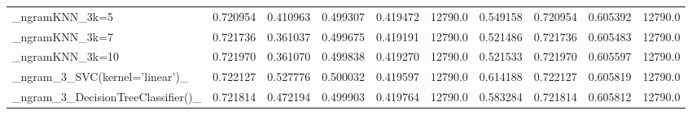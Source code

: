 \begin{tabular}{lrrrrrrrrr}
\_ngramKNN\_3k=5                                     &  0.720954 &         0.410963 &      0.499307 &        0.419472 &        12790.0 &            0.549158 &         0.720954 &           0.605392 &           12790.0 \\
\_ngramKNN\_3k=7                                     &  0.721736 &         0.361037 &      0.499675 &        0.419191 &        12790.0 &            0.521486 &         0.721736 &           0.605483 &           12790.0 \\
\_ngramKNN\_3k=10                                    &  0.721970 &         0.361070 &      0.499838 &        0.419270 &        12790.0 &            0.521533 &         0.721970 &           0.605597 &           12790.0 \\
\_ngram\_3\_SVC(kernel='linear')\_                     &  0.722127 &         0.527776 &      0.500032 &        0.419597 &        12790.0 &            0.614188 &         0.722127 &           0.605819 &           12790.0 \\
\_ngram\_3\_DecisionTreeClassifier()\_                 &  0.721814 &         0.472194 &      0.499903 &        0.419764 &        12790.0 &            0.583284 &         0.721814 &           0.605812 &           12790.0 \\
\bottomrule
\end{tabular}
